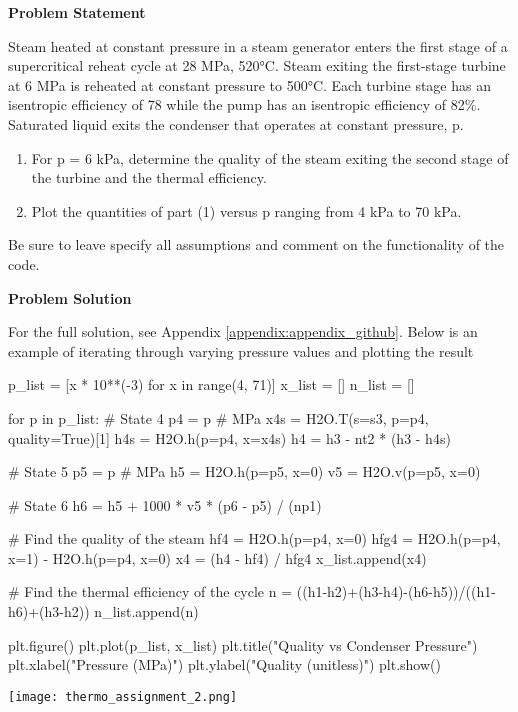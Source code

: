 \begin{tcolorbox}[breakable, enhanced jigsaw, title=ME 513: Assignment \ref{thermo_assignment_2}, 
    colframe=blue!70!white, colback=gray!20]

    \textbf{Problem Statement}

    Steam heated at constant pressure in a steam generator enters the first stage of a
    supercritical reheat cycle at 28 MPa, 520°C. Steam exiting the first-stage turbine at 6 MPa is
    reheated at constant pressure to 500°C. Each turbine stage has an isentropic efficiency of 78%
    while the pump has an isentropic efficiency of 82\%. Saturated liquid exits the condenser that
    operates at constant pressure, p.

    \begin{enumerate}
        \item For p = 6 kPa, determine the quality of the steam exiting the second stage of the 
        turbine and the thermal efficiency.
        \item Plot the quantities of part (1) versus p ranging from 4 kPa to 70 kPa.
    \end{enumerate}

    Be sure to leave specify all assumptions and comment on the functionality of the code. 

    \tcblower
    \textbf{Problem Solution}

    For the full solution, see Appendix \ref{appendix:appendix_github}. Below is an example of 
    iterating through varying pressure values and plotting the result

    \begin{python}
    p_list = [x * 10**(-3) for x in range(4, 71)]
    x_list = []
    n_list = []

    for p in p_list:
        # State 4
        p4 = p # MPa
        x4s = H2O.T(s=s3, p=p4, quality=True)[1]
        h4s = H2O.h(p=p4, x=x4s)
        h4 = h3 - nt2 * (h3 - h4s)

        # State 5
        p5 = p # MPa
        h5 = H2O.h(p=p5, x=0)
        v5 = H2O.v(p=p5, x=0)

        # State 6
        h6 = h5 + 1000 * v5 * (p6 - p5) / (np1)

        # Find the quality of the steam
        hf4 = H2O.h(p=p4, x=0)
        hfg4 = H2O.h(p=p4, x=1) - H2O.h(p=p4, x=0)
        x4 = (h4 - hf4) / hfg4
        x_list.append(x4)

        # Find the thermal efficiency of the cycle
        n = ((h1-h2)+(h3-h4)-(h6-h5))/((h1-h6)+(h3-h2))
        n_list.append(n)

    plt.figure()
    plt.plot(p_list, x_list)
    plt.title("Quality vs Condenser Pressure")
    plt.xlabel("Pressure (MPa)")
    plt.ylabel("Quality (unitless)")
    plt.show()
    \end{python}
    \texttt{[image: thermo\_assignment\_2.png]}
\end{tcolorbox}

